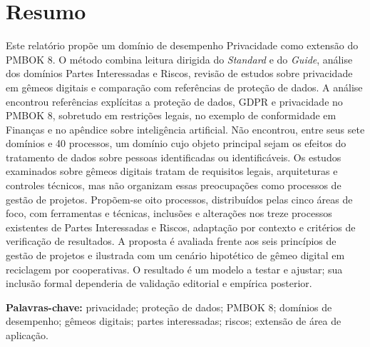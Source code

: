 \documentclass[11pt,a4paper]{article}
\newcommand{\onelineskip}{\baselineskip}
\newenvironment{resumo}[1][Resumo]{\section*{#1}\noindent\ignorespaces}{\bigskip}
\begin{document}
\begin{resumo}
Este relatório propõe um domínio de desempenho Privacidade como extensão do PMBOK 8. O método combina leitura dirigida do \textit{Standard} e do \textit{Guide}, análise dos domínios Partes Interessadas e Riscos, revisão de estudos sobre privacidade em gêmeos digitais e comparação com referências de proteção de dados. A análise encontrou referências explícitas a proteção de dados, GDPR e privacidade no PMBOK 8, sobretudo em restrições legais, no exemplo de conformidade em Finanças e no apêndice sobre inteligência artificial. Não encontrou, entre seus sete domínios e 40 processos, um domínio cujo objeto principal sejam os efeitos do tratamento de dados sobre pessoas identificadas ou identificáveis. Os estudos examinados sobre gêmeos digitais tratam de requisitos legais, arquiteturas e controles técnicos, mas não organizam essas preocupações como processos de gestão de projetos. Propõem-se oito processos, distribuídos pelas cinco áreas de foco, com ferramentas e técnicas, inclusões e alterações nos treze processos existentes de Partes Interessadas e Riscos, adaptação por contexto e critérios de verificação de resultados. A proposta é avaliada frente aos seis princípios de gestão de projetos e ilustrada com um cenário hipotético de gêmeo digital em reciclagem por cooperativas. O resultado é um modelo a testar e ajustar; sua inclusão formal dependeria de validação editorial e empírica posterior.

\vspace{\onelineskip}
\noindent\textbf{Palavras-chave:} privacidade; proteção de dados; PMBOK 8; domínios de desempenho; gêmeos digitais; partes interessadas; riscos; extensão de área de aplicação.
\end{resumo}
\end{document}
